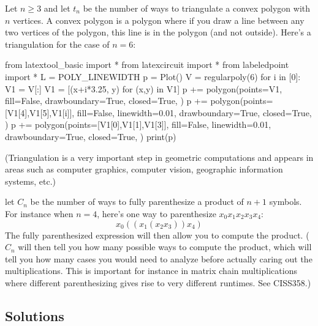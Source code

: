 \begin{ex}
  Let $n \geq 3$ and let $t_n$ be the number of ways to triangulate a convex
  polygon
  with $n$ vertices.
  A convex polygon is a polygon where if you draw a line between any two
  vertices of the polygon, this line is in the polygon (and not outside).
  Here's a triangulation for the case of $n = 6$:
\begin{python}
from latextool_basic import *
from latexcircuit import *
from labeledpoint import *
L = POLY_LINEWIDTH
p = Plot()
V = regularpoly(6)
for i in [0]:
    V1 = V[:]
    V1 = [(x+i*3.25, y) for (x,y) in V1]
    p += polygon(points=V1, 
                fill=False,
                drawboundary=True,
                closed=True,
                )
    p += polygon(points=[V1[4],V1[5],V1[i]], 
                fill=False, linewidth=0.01,
                drawboundary=True,
                closed=True,
                )
    p += polygon(points=[V1[0],V1[1],V1[3]], 
                fill=False, linewidth=0.01,
                drawboundary=True,
                closed=True,
                )
print(p)
\end{python}
(Triangulation is a very important step in geometric computations
and appears in areas
such as computer graphics, computer vision, geographic information
systems, etc.)
\end{ex}



\begin{ex}
  let $C_n$ be the number of ways to fully parenthesize a product of
  $n + 1$ symbols.
  For instance when $n = 4$,
  here's one way to parenthesize $x_0 x_1 x_2 x_3 x_4$:
  \[
  x_0 ((x_1 (x_2 x_3)) x_4)
  \]
  The fully parenthesized expression will then allow you to compute
  the product.
  ($C_n$ will then tell you how many possible ways to compute the
  product, which will tell you how many cases you would need to analyze
  before actually caring out the multiplications.
  This is important for instance in matrix chain multiplications
  where different parenthesizing gives rise to very different runtimes.
  See CISS358.)
\end{ex}

\newpage
\subsection*{Solutions}
